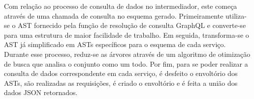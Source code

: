 Com relação ao processo de consulta de dados no intermediador, este começa através de uma chamada de consulta no esquema gerado. Primeiramente utiliza-se o AST fornecido pela função de resolução de consulta GraphQL e converte-se para uma estrutura de maior facilidade de trabalho. Em seguida, transforma-se o AST já simplificado em ASTs específicos para o esquema de cada serviço. Durante esse processo, reduz-se as árvores através de um algoritmo de otimização de busca que analisa o conjunto como um todo. Por fim, para se poder realizar a consulta de dados correspondente em cada serviço, é desfeito o envoltório dos ASTs, são realizadas as requisições, é criado o envoltório e é feita a união dos dados JSON retornados.
